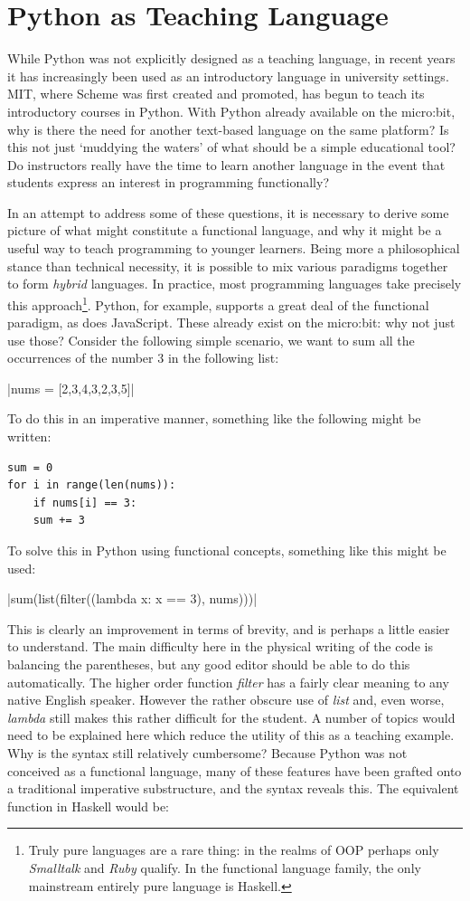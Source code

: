 \documentclass[12pt, a4paper]{report}
\begin{document}
\section{Python as Teaching Language}
While Python was not explicitly designed as a teaching language, in recent years it has increasingly
been used as an introductory language in university settings. MIT, where Scheme was first created
and promoted, has begun to teach its introductory courses in Python. With Python already available
on the micro:bit, why is there the need for another text-based language on the same platform? Is
this not just `muddying the waters' of what should be a simple educational tool? Do instructors
really have the time to learn another language in the event that students express an interest in programming
functionally?

In an attempt to address some of these questions, it is necessary to derive some picture of what might
constitute a functional language, and why it might be a useful way to teach programming to younger
learners. Being more a philosophical stance than technical necessity, it is possible to mix various
paradigms together to form \textit{hybrid} languages. In practice, most programming languages take
precisely this approach\footnote{Truly pure languages are a rare thing: in the realms of OOP perhaps
only \textit{Smalltalk} and \textit{Ruby} qualify. In the functional language family, the only
mainstream entirely pure language is Haskell.}. Python, for example, supports a great deal of the 
functional paradigm, as does JavaScript. These already exist on the micro:bit: why not just use those? 
Consider the following simple scenario, we want to sum all the occurrences of the number 3 in the
following list: 

|nums = [2,3,4,3,2,3,5]|

To do this in an imperative manner, something like the following might be written:

\begin{verbatim}
sum = 0
for i in range(len(nums)):
    if nums[i] == 3:
    sum += 3
\end{verbatim}

To solve this in Python using functional concepts, something like this might be used:

|sum(list(filter((lambda x: x == 3), nums)))|

This is clearly an improvement in terms of brevity, and is perhaps a little easier to understand.
The main difficulty here in the physical writing of the code is balancing the parentheses,
but any good editor should be able to do this automatically. The higher order function
\textit{filter} has a fairly clear meaning to any native English speaker. However the rather obscure
use of \textit{list} and, even worse, \textit{lambda} still makes this rather difficult for the
student. A number of topics would need to be explained here which reduce the utility
of this as a teaching example. Why is the syntax still relatively cumbersome? Because Python was
not conceived as a functional language, many of these features have been grafted onto a traditional
imperative substructure, and the syntax reveals this. The equivalent function in Haskell would be:
\end{document}
